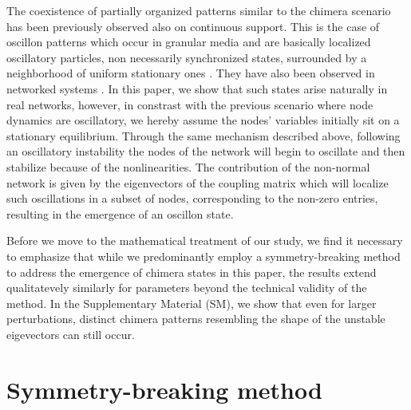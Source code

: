 \documentclass[prx,twocolumn,amsmath,noshowkeys,noshowpacs,amssymb]{revtex4-2}
\begin{document}
The coexistence of partially organized patterns similar to the chimera scenario has been previously observed also on continuous support. This is the case of oscillon patterns which occur in granular media and are basically localized oscillatory {particles}, non necessarily synchronized states, surrounded by a neighborhood of uniform stationary ones \cite{umbanhowar_localized_1996, Vanag_Epstein}. They have also been observed in networked systems \cite{oscillon_net}. In this paper, we show that such states arise naturally in real networks, however, in constrast with the previous scenario where node dynamics are oscillatory, we hereby assume the nodes' variables initially sit on a stationary equilibrium. Through the same mechanism described above, following an oscillatory instability the nodes of the network will begin to oscillate and then stabilize because of the nonlinearities. {The} contribution of the non-normal network is given by the {eigenvectors of the coupling matrix}  which will localize such oscillations in a subset of nodes, corresponding to the non-zero entries, resulting in the emergence of an oscillon state. 

Before we move to the mathematical treatment of our study, we find it necessary to emphasize that while we predominantly employ a symmetry-breaking method to address the emergence of chimera states in this paper, the results extend qualitatevely similarly for parameters beyond the technical validity of the method. In the Supplementary Material (SM), we show that even for larger perturbations, distinct chimera patterns resembling the shape of the unstable eigevectors can still occur. 





\section{Symmetry-breaking method}
\label{sec:I}
\noindent
\end{document}
